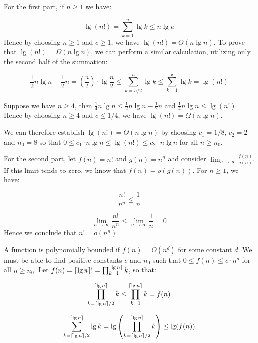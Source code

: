 \documentclass[a4paper,12pt]{article}
\DeclarePairedDelimiter\ceil{\lceil}{\rceil}
\begin{document}
For the first part, if $n \ge 1$ we have:

\[ \lg (n!) = \sum_{k=1}^n \lg k \le n \lg n \]
Hence by choosing $n \ge 1$ and $c \ge 1$, we have $\lg(n!) = O(n \lg n)$. To prove that $\lg(n!) = \Omega(n \lg n)$, we can perform a similar calculation, utilizing only the second half of the summation:

\[ \frac{1}{2}n\lg n -\frac{1}{2}n =\left(\frac{n}{2}\right) \cdot \lg \frac{n}{2} \le \sum_{k=n/2}^n \lg k \le \sum_{k=1}^n \lg k = \lg(n!) \]

Suppose we have $n \ge 4$, then $\frac{1}{4}n\lg n \le \frac{1}{2}n \lg n - \frac{1}{2}n$ and $\frac{1}{4}n \lg n \le \lg (n!)$. Hence by choosing $n \ge 4$ and $c \le1/4$, we have $\lg(n!) = \Omega(n\lg n)$.

We can therefore establish $\lg(n!) = \Theta(n\lg n)$ by choosing $c_1 = 1/8$, $c_2 = 2$ and $n_0 = 8$ so that $0 \le c_1 \cdot n\lg n \le \lg(n!) \le c_2 \cdot n\lg n$ for all $n \ge n_0$.

For the second part, let $f(n)=n!$ and $g(n)=n^n$ and consider $\lim_{n \rightarrow \infty} \frac{f(n)}{g(n)}$. If this limit tends to zero, we know that $f(n) = o(g(n))$. For $n \ge 1$, we have:

\[ \frac{n!}{n^n} \le \frac{1}{n} \]

\[ \lim_{n \rightarrow \infty} \frac{n!}{n^n} \le \lim_{n \rightarrow \infty} \frac{1}{n} = 0 \]
Hence we conclude that $n! = o(n^n)$.

\vspace{2mm}

A function is polynomially bounded if $f(n) = O(n^d)$ for some constant $d$. We must be able to find positive constants $c$ and $n_0$ such that $0 \le f(n) \le c \cdot n^d$ for all $n \ge n_0$. Let $f(n) = \ceil{\lg n}! = \prod_{k=1}^{\ceil{\lg n}} k$, so that:

\[ \prod_{k=\ceil{\lg n}/2}^{\ceil{\lg n}} k \le \prod_{k=1}^{\ceil{\lg n}} k =  f(n) \]

\[ \sum_{k=\ceil{\lg n}/2}^{\ceil{\lg n}} \lg k = \lg\left(\prod_{k=\ceil{\lg n}/2}^{\ceil{\lg n}} k\right) \le   \lg(f(n)) \]
\end{document}
